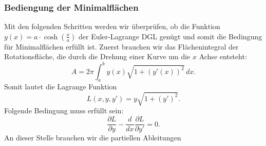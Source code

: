 \subsubsection{Bediengung der Minimalflächen}
Mit den folgenden Schritten werden wir überprüfen, ob die Funktion  \( y(x) = a \cdot \cosh \left( \frac{x}{a} \right) \) der Euler-Lagrange DGL genügt und somit die Bedingung für Minimalflächen erfüllt ist.
Zuerst brauchen wir das Flächenintegral der Rotationsfläche, die durch die Drehung einer Kurve um die $x$ Achse entsteht:
\begin{equation}
	A = 2\pi \int_{a}^{b} y(x) \sqrt{1 + (y'(x))^2} \,dx.
\end{equation}
Somit lautet die Lagrange Funktion 
\begin{equation}
	L(x, y, y') = y \sqrt{1 + (y')^2}.	
\end{equation}
Folgende Bedingung muss erfüllt sein: 
\begin{equation}
	\frac{\partial L}{\partial y} - \frac{d}{dx}  \frac{\partial L}{\partial y'} = 0.
\end{equation}
An dieser Stelle brauchen wir die partiellen Ableitungen

